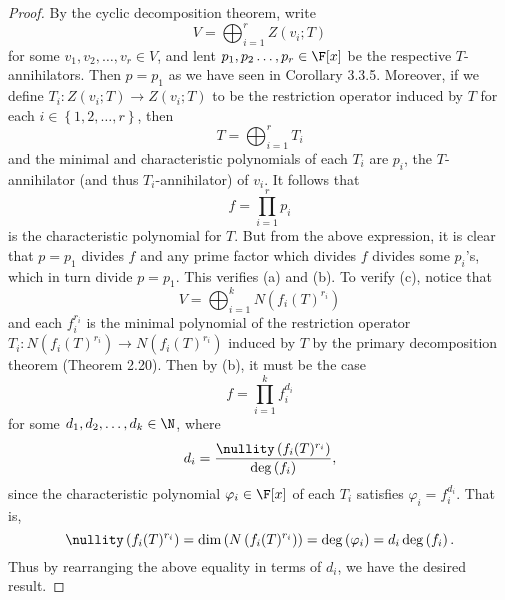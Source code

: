 \documentclass[linearalgebraII]{subfiles}
\begin{document}
    \begin{proof}
        By the cyclic decomposition theorem, write
        \begin{equation*}
            V = \bigoplus^{r}_{i=1} Z(v_i;T)
        \end{equation*}
        for some $v_1,v_2,\ldots,v_r\in V$, and lent $p_1,p_2\ldots,p_r\in\F[x]$ be the respective $T$-annihilators. Then $p=p_1$ as we have seen in Corollary 3.3.5. Moreover, if we define $T_i:Z\left( v_i;T \right) \to Z\left( v_i;T \right)$ to be the restriction operator induced by $T$ for each $i\in \left\lbrace 1,2,\ldots,r \right\rbrace $, then
        \begin{equation*}
            T = \bigoplus^{r}_{i=1} T_i
        \end{equation*}
        and the minimal and characteristic polynomials of each $T_i$ are $p_i$, the $T$-annihilator (and thus $T_i$-annihilator) of $v_i$. It follows that
        \begin{equation*}
            f = \prod^{r}_{i=1} p_i
        \end{equation*}
        is the characteristic polynomial for $T$. But from the above expression, it is clear that $p=p_1$ divides $f$ and any prime factor which divides $f$ divides some $p_i$'s, which in turn divide $p=p_1$. This verifies (a) and (b). To verify (c), notice that
        \begin{equation*}
            V = \bigoplus^{k}_{i=1} N\left( f_i(T)^{r_i} \right) 
        \end{equation*}
        and each $f_i^{r_i}$ is the minimal polynomial of the restriction operator $T_i:N\left( f_i(T)^{r_i} \right) \to N\left( f_i(T)^{r_i} \right)$ induced by $T$ by the primary decomposition theorem (Theorem 2.20). Then by (b), it must be the case
        \begin{equation*}
            f = \prod^{k}_{i=1} f_i^{d_i}
        \end{equation*}
        for some $d_1,d_2,\ldots,d_k\in\N$, where
        \begin{equation*}
            d_i = \frac{\nullity\left( f_i(T)^{r_i} \right) }{\deg\left( f_i \right) },
        \end{equation*}
        since the characteristic polynomial $\varphi_i\in\F[x]$ of each $T_i$ satisfies $\varphi_i=f_i^{d_i}$. That is,
        \begin{equation*}
            \nullity\left( f_i(T)^{r_i} \right) = \dim\left( N\left( f_i(T)^{r_i} \right)  \right) = \deg\left( \varphi_i \right) = d_i\deg\left( f_i \right) .
        \end{equation*}
        Thus by rearranging the above equality in terms of $d_i$, we have the desired result.
    \end{proof}
\end{document}
